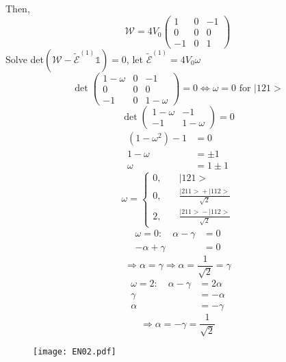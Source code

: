 \documentclass[12pt,fancychapters]{report}
\numberwithin{equation}{section}
\begin{document}
Then, 
\begin{equation}
  \mathcal{W} = 4V_0 
  \begin{pmatrix}
  1 & 0 & -1\\
  0 & 0 & 0\\
  -1 & 0 & 1
  \end{pmatrix}
\end{equation}
Solve det$(\mathcal{W}-\tilde{\mathcal{E}}^{(1)} \mathbb{1}) = 0$, let $\tilde{\mathcal{E}}^{(1)}
 = 4V_0\omega$
 \[
  \det
  \begin{pmatrix}
  1-\omega & 0 & -1\\
  0 & 0 & 0\\
  -1 & 0 & 1-\omega
  \end{pmatrix}
  = 0 \Longleftrightarrow \omega = 0\,\,\text{for}\,\,\big|121\big> 
 \]
 \[
  \det 
  \begin{pmatrix}
  1-\omega & -1\\
  -1 & 1-\omega
\end{pmatrix}
= 0
 \]
\begin{align*}
  \left(1-\omega^2 \right) - 1 &= 0\\
  1 - \omega & = \pm 1\\
  \omega & = 1 \pm 1
\end{align*}
\[
\omega = 
\begin{cases}
    0,& \quad \big|121\big>\\
    0,& \quad \frac{\big|211\big> + \big|112\big>}{\sqrt{2}}\\
    2,& \quad \frac{\big|211\big> - \big|112\big>}{\sqrt{2}}
  \end{cases}
\]
\begin{align*}
  \omega = 0: \quad \alpha - \gamma &= 0\\
  -\alpha + \gamma & = 0
\end{align*}
\[
  \Rightarrow \alpha = \gamma \Rightarrow \alpha = \frac{1}{\sqrt{2}} = \gamma
\]
\begin{align*}
  \omega = 2: \quad \alpha- \gamma  &= 2 \alpha\\
  \gamma &= -\alpha\\
  \alpha &= -\gamma
\end{align*}
\[
  \Rightarrow \alpha = -\gamma = \frac{1}{\sqrt{2}}
\]
\begin{figure}[H]
  \centering
	\texttt{[image: EN02.pdf]}
\end{figure}
\end{document}
